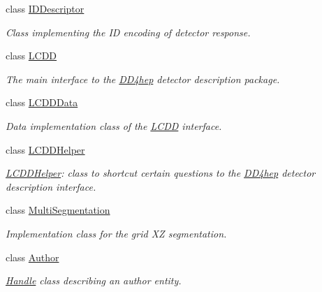 \begin{DoxyCompactItemize}
class \hyperlink{class_d_d4hep_1_1_geometry_1_1_i_d_descriptor}{IDDescriptor}
\begin{DoxyCompactList}\small\item\em Class implementing the ID encoding of detector response. \item\end{DoxyCompactList}\item 
class \hyperlink{class_d_d4hep_1_1_geometry_1_1_l_c_d_d}{LCDD}
\begin{DoxyCompactList}\small\item\em The main interface to the \hyperlink{namespace_d_d4hep}{DD4hep} detector description package. \item\end{DoxyCompactList}\item 
class \hyperlink{class_d_d4hep_1_1_geometry_1_1_l_c_d_d_data}{LCDDData}
\begin{DoxyCompactList}\small\item\em Data implementation class of the \hyperlink{class_d_d4hep_1_1_geometry_1_1_l_c_d_d}{LCDD} interface. \item\end{DoxyCompactList}\item 
class \hyperlink{class_d_d4hep_1_1_geometry_1_1_l_c_d_d_helper}{LCDDHelper}
\begin{DoxyCompactList}\small\item\em \hyperlink{class_d_d4hep_1_1_geometry_1_1_l_c_d_d_helper}{LCDDHelper}: class to shortcut certain questions to the \hyperlink{namespace_d_d4hep}{DD4hep} detector description interface. \item\end{DoxyCompactList}\item 
class \hyperlink{class_d_d4hep_1_1_geometry_1_1_multi_segmentation}{MultiSegmentation}
\begin{DoxyCompactList}\small\item\em Implementation class for the grid XZ segmentation. \item\end{DoxyCompactList}\item 
class \hyperlink{class_d_d4hep_1_1_geometry_1_1_author}{Author}
\begin{DoxyCompactList}\small\item\em \hyperlink{class_d_d4hep_1_1_handle}{Handle} class describing an author entity. \item\end{DoxyCompactList}\item 

\end{DoxyCompactItemize}
